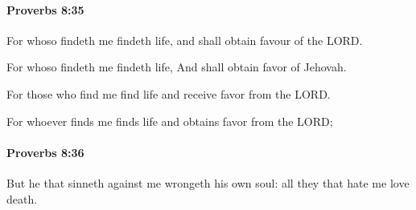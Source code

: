 		\paragraph{Proverbs 8:35} %
			\label{PROVERBS-8-35}

			For whoso findeth me findeth life, and shall obtain favour of the LORD.

			\begin{versebox}
					\item[BHS] 
					\item[ASV] For whoso findeth me findeth life, And shall obtain favor of Jehovah.
					\item[NIV] For those who find me find life and receive favor from the LORD.
					\item[NRSV] For whoever finds me finds life and obtains favor from the LORD;
			\end{versebox}

		\paragraph{Proverbs 8:36} %
			\label{PROVERBS-8-36}

			But he that sinneth against me wrongeth his own soul: all they that hate me love death.

